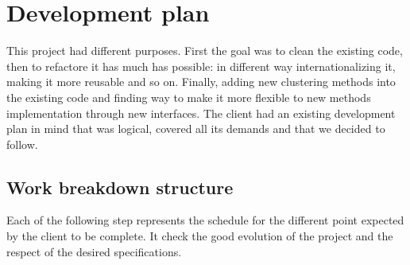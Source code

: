 \section{Development plan}
This project had different purposes. First the goal was to clean the existing code, then to refactore it has much has possible: in different way internationalizing it, making it more reusable and so on. Finally, adding new clustering methods into the existing code and finding way to make it more flexible to new methods implementation through new interfaces.
The client had an existing development plan in mind that was logical, covered all its demands and that we decided to follow.


\subsection{Work breakdown structure}
Each of the following step represents the schedule for the different point expected by the client to be complete. It check the good evolution of the project and the respect of the desired specifications.
